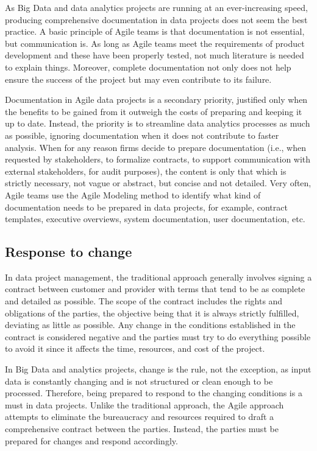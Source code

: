 \documentclass[
  letterpaper,
  DIV=11,
  numbers=noendperiod]{scrreprt}
\begin{document}
As Big Data and data analytics projects are running at an
ever-increasing speed, producing comprehensive documentation in data
projects does not seem the best practice. A basic principle of Agile
teams is that documentation is not essential, but communication is. As
long as Agile teams meet the requirements of product development and
these have been properly tested, not much literature is needed to
explain things. Moreover, complete documentation not only does not help
ensure the success of the project but may even contribute to its
failure.

Documentation in Agile data projects is a secondary priority, justified
only when the benefits to be gained from it outweigh the costs of
preparing and keeping it up to date. Instead, the priority is to
streamline data analytics processes as much as possible, ignoring
documentation when it does not contribute to faster analysis. When for
any reason firms decide to prepare documentation (i.e., when requested
by stakeholders, to formalize contracts, to support communication with
external stakeholders, for audit purposes), the content is only that
which is strictly necessary, not vague or abstract, but concise and not
detailed. Very often, Agile teams use the Agile Modeling method to
identify what kind of documentation needs to be prepared in data
projects, for example, contract templates, executive overviews, system
documentation, user documentation, etc.

\hypertarget{response-to-change}{%
\subsection{Response to change}\label{response-to-change}}

In data project management, the traditional approach generally involves
signing a contract between customer and provider with terms that tend to
be as complete and detailed as possible. The scope of the contract
includes the rights and obligations of the parties, the objective being
that it is always strictly fulfilled, deviating as little as possible.
Any change in the conditions established in the contract is considered
negative and the parties must try to do everything possible to avoid it
since it affects the time, resources, and cost of the project.

In Big Data and analytics projects, change is the rule, not the
exception, as input data is constantly changing and is not structured or
clean enough to be processed. Therefore, being prepared to respond to
the changing conditions is a must in data projects. Unlike the
traditional approach, the Agile approach attempts to eliminate the
bureaucracy and resources required to draft a comprehensive contract
between the parties. Instead, the parties must be prepared for changes
and respond accordingly.
\end{document}
